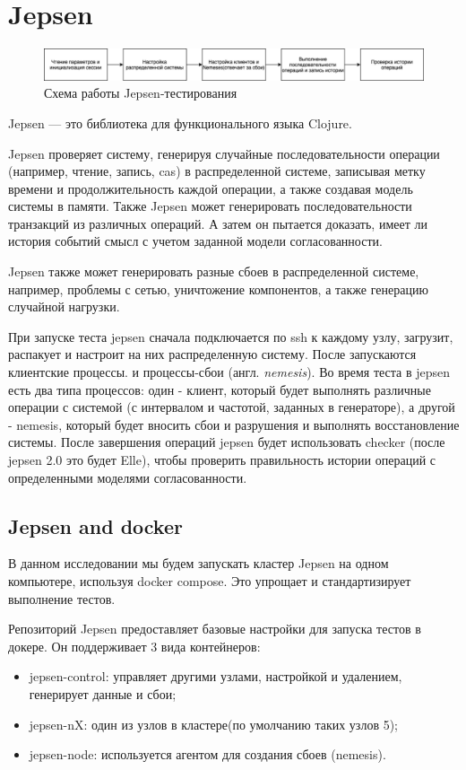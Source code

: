 \documentclass[12pt,  openany]{book}
\begin{document}
\section{Jepsen}
\begin{figure}[H]
  \includegraphics[width=\textwidth]{jepsen.jpeg}
  \caption{Схема работы Jepsen-тестирования}
\end{figure}
\par
Jepsen --- это библиотека для функционального языка Clojure.
\par
Jepsen проверяет систему, генерируя случайные последовательности операции (например, чтение, запись, cas) в распределенной системе, записывая метку времени и продолжительность каждой операции, а также создавая модель системы в памяти.  Также Jepsen может генерировать последовательности транзакций из различных операций. А затем он пытается доказать, имеет ли история событий смысл с учетом заданной модели согласованности.
\par
Jepsen также может генерировать разные сбоев в распределенной системе, например, проблемы с сетью, уничтожение компонентов, а также генерацию случайной нагрузки.
\par
При запуске теста jepsen сначала подключается по ssh к каждому узлу, загрузит, распакует и настроит на них распределенную систему.
После запускаются клиентские процессы. и процессы-сбои (англ. \textit{nemesis}). Во время теста в jepsen есть два типа процессов: один - клиент, который будет выполнять различные операции с системой (с интервалом и частотой, заданных в генераторе), а другой - nemesis, который будет вносить сбои и разрушения и выполнять восстановление системы. После завершения операций jepsen будет использовать checker (после jepsen 2.0 это будет Elle), чтобы проверить правильность истории операций с определенными моделями согласованности.

\subsection{Jepsen and docker}
В данном исследовании мы будем запускать кластер Jepsen на одном компьютере, используя docker compose.  Это упрощает и стандартизирует выполнение тестов. 
\par
Репозиторий Jepsen предоставляет базовые настройки для запуска тестов в докере. Он поддерживает 3 вида контейнеров:  
\begin{itemize}
\item jepsen-control:  управляет другими узлами, настройкой и удалением, генерирует данные и сбои;
\item jepsen-nX:  один из узлов в кластере(по умолчанию таких узлов 5);
\item jepsen-node: используется агентом для создания сбоев (nemesis). 
\end{itemize}
\end{document}

